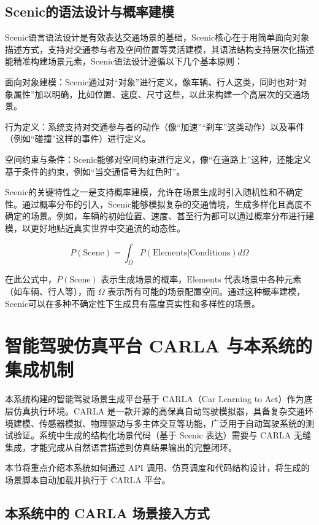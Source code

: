 \subsection{Scenic的语法设计与概率建模}

Scenic语言语法设计是有效表达交通场景的基础，Scenic核心在于用简单面向对象描述方式，支持对交通参与者及空间位置等灵活建模，其语法结构支持层次化描述能精准构建场景元素，Scenic语法设计遵循以下几个基本原则：


面向对象建模：Scenic通过对“对象”进行定义，像车辆、行人这类，同时也对“对象属性”加以明确，比如位置、速度、尺寸这些，以此来构建一个高层次的交通场景。

行为定义：系统支持对交通参与者的动作（像“加速”“刹车”这类动作）以及事件（例如“碰撞”这样的事件）进行定义。

空间约束与条件：Scenic能够对空间约束进行定义，像“在道路上”这种，还能定义基于条件的约束，例如“当交通信号为红色时”。


Scenic的关键特性之一是支持概率建模，允许在场景生成时引入随机性和不确定性。通过概率分布的引入，Scenic能够模拟复杂的交通情境，生成多样化且高度不确定的场景。例如，车辆的初始位置、速度、甚至行为都可以通过概率分布进行建模，以更好地贴近真实世界中交通流的动态性。

\begin{equation}
	P(\text{Scene}) = \int_{\Omega} P(\text{Elements} | \text{Conditions}) d\Omega
\end{equation}

在此公式中，$P(\text{Scene})$ 表示生成场景的概率，$\text{Elements}$ 代表场景中各种元素（如车辆、行人等），而 $\Omega$ 表示所有可能的场景配置空间。通过这种概率建模，Scenic可以在多种不确定性下生成具有高度真实性和多样性的场景。


\section{智能驾驶仿真平台 CARLA 与本系统的集成机制}

本系统构建的智能驾驶场景生成平台基于 CARLA（Car Learning to Act）作为底层仿真执行环境。CARLA 是一款开源的高保真自动驾驶模拟器，具备复杂交通环境建模、传感器模拟、物理驱动与多主体交互等功能，广泛用于自动驾驶系统的测试验证。系统中生成的结构化场景代码（基于 Scenic 表达）需要与 CARLA 无缝集成，才能完成从自然语言描述到仿真结果输出的完整闭环。

本节将重点介绍本系统如何通过 API 调用、仿真调度和代码结构设计，将生成的场景脚本自动加载并执行于 CARLA 平台。

\subsection{本系统中的 CARLA 场景接入方式}

